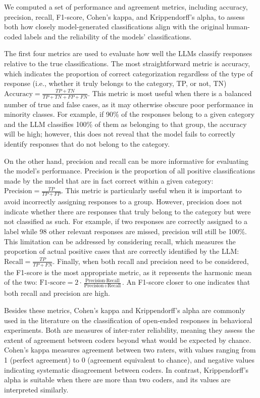 \documentclass[11pt]{article}
\begin{document}
\begin{sloppypar}
We computed a set of performance and agreement metrics, including accuracy, precision, recall, F1-score, Cohen’s kappa, and Krippendorff’s alpha, to assess both how closely model-generated classifications align with the original human-coded labels and the reliability of the models’ classifications. 

The first four metrics are used to evaluate how well the LLMs classify responses relative to the true classifications. The most straightforward metric is accuracy, which indicates the proportion of correct categorization regardless of the type of response (i.e., whether it truly belongs to the category, TP, or not, TN) $\text{Accuracy} = \frac{TP + TN}{TP + TN + FP + FN} $. This metric is most useful when there is a balanced number of true and false cases, as it may otherwise obscure poor performance in minority classes. For example, if 90\% of the responses belong to a given category and the LLM classifies 100\% of them as belonging to that group, the accuracy will be high; however, this does not reveal that the model fails to correctly identify responses that do not belong to the category.

On the other hand, precision and recall can be more informative for evaluating the model's performance. Precision is the proportion of all positive classifications made by the model that are in fact correct within a given category: $\text{Precision} = \frac{TP}{TP + FP}$. This metric is particularly useful when it is important to avoid incorrectly assigning responses to a group. However, precision does not indicate whether there are responses that truly belong to the category but were not classified as such. For example, if two responses are correctly assigned to a label while 98 other relevant responses are missed, precision will still be 100\%. This limitation can be addressed by considering recall, which measures the proportion of actual positive cases that are correctly identified by the LLM: $\text{Recall} = \frac{TP}{TP + FN}$. Finally, when both recall and precision need to be considered, the F1-score is the most appropriate metric, as it represents the harmonic mean of the two: $\text{F1-score} = 2 \cdot \frac{\text{Precision} \cdot \text{Recall}}{\text{Precision} + \text{Recall}}$. An F1-score closer to one indicates that both recall and precision are high.

Besides these metrics, Cohen’s kappa and Krippendorff’s alpha are commonly used in the literature on the classification of open-ended responses in behavioral experiments. Both are measures of inter-rater reliability, meaning they assess the extent of agreement between coders beyond what would be expected by chance. Cohen’s kappa measures agreement between two raters, with values ranging from 1 (perfect agreement) to 0 (agreement equivalent to chance), and negative values indicating systematic disagreement between coders. In contrast, Krippendorff’s alpha is suitable when there are more than two coders, and its values are interpreted similarly.


\end{sloppypar}
\end{document}
